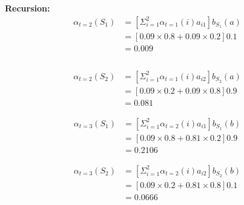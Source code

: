 \documentclass[12pt]{article}
\begin{document}
\textbf{Recursion:}\\
\begin{equation}
	\begin{aligned}
		\alpha_{t=2}(S_1) &= [ \Sigma_{i=1}^2 \alpha_{t=1}(i)a_{i1}]b_{S_1}(a)\\
		&= [0.09 \times 0.8 + 0.09 \times 0.2]0.1\\
		&= 0.009\\ \\
	\end{aligned}
\end{equation}

\begin{equation}
	\begin{aligned}
		\alpha_{t=2}(S_2) &= [ \Sigma_{i=1}^2 \alpha_{t=1}(i)a_{i2}]b_{S_2}(a)\\
		&= [0.09 \times 0.2 + 0.09 \times 0.8]0.9\\
		&= 0.081
	\end{aligned}
\end{equation}

\begin{equation}
	\begin{aligned}
		\alpha_{t=3}(S_1) &= [ \Sigma_{i=1}^2 \alpha_{t=2}(i)a_{i1}]b_{S_1}(b)\\
		&= [0.09 \times 0.8 + 0.81 \times 0.2]0.9\\
		&= 0.2106
	\end{aligned}
\end{equation}

\begin{equation}
	\begin{aligned}
		\alpha_{t=3}(S_2) &= [ \Sigma_{i=1}^2 \alpha_{t=2}(i)a_{i2}]b_{S_2}(b)\\
		&= [0.09 \times 0.2 + 0.81 \times 0.8]0.1\\
		&= 0.0666
	\end{aligned}
\end{equation}
\end{document}
